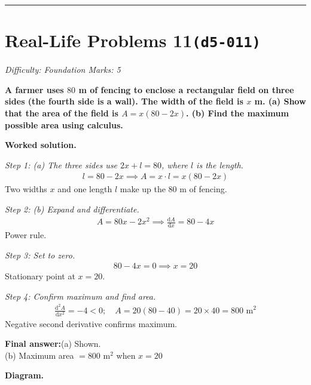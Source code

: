 \documentclass[11pt]{article}
\newcommand{\question}[1]{\par\medskip\noindent\textbf{#1}\par}
\begin{document}
\medskip\hrule

\section*{Real-Life Problems 11\quad\small\texttt{(d5-011)}}
\textit{Difficulty: Foundation \quad\textbar\quad Marks: 5}

\question{A farmer uses \( 80 \) m of fencing to enclose a rectangular field on three sides (the fourth side is a wall). The width of the field is \( x \) m. (a) Show that the area of the field is \( A = x(80 - 2x) \). (b) Find the maximum possible area using calculus.}

\textbf{Worked solution.}

\textit{Step 1: (a) The three sides use \( 2x + l = 80 \), where \( l \) is the length.}
\[\begin{gathered}
l = 80 - 2x \implies A = x \cdot l = x(80 - 2x)
\end{gathered}\]
Two widths \( x \) and one length \( l \) make up the 80 m of fencing.

\textit{Step 2: (b) Expand and differentiate.}
\[\begin{gathered}
A = 80x - 2x^2 \implies \frac{\mathrm{d}A}{\mathrm{d}x} = 80 - 4x
\end{gathered}\]
Power rule.

\textit{Step 3: Set to zero.}
\[\begin{gathered}
80 - 4x = 0 \implies x = 20
\end{gathered}\]
Stationary point at \( x = 20 \).

\textit{Step 4: Confirm maximum and find area.}
\[\begin{gathered}
\frac{\mathrm{d}^2A}{\mathrm{d}x^2} = -4 < 0; \quad A = 20(80 - 40) = 20 \times 40 = 800 \text{ m}^2
\end{gathered}\]
Negative second derivative confirms maximum.

\begin{answerbox}
\textbf{Final answer:}\quad (a) Shown. \\[3pt]  (b) Maximum area \(\displaystyle  = 800 \text{ m}^2 \) when \(\displaystyle  x = 20 \)
\end{answerbox}
\textbf{Diagram.}
\end{document}
